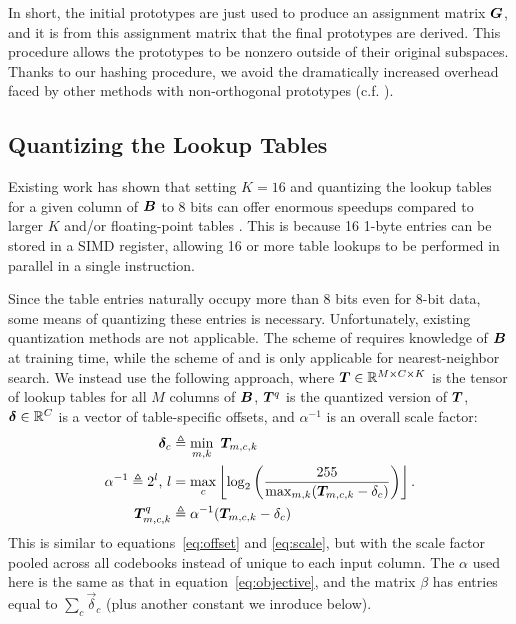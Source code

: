 In short, the initial prototypes are just used to produce an assignment matrix $\bm{G}$, and it is from this assignment matrix that the final prototypes are derived. This procedure allows the prototypes to be nonzero outside of their original subspaces. Thanks to our hashing procedure, we avoid the dramatically increased overhead faced by other methods with non-orthogonal prototypes (c.f. \cite{otq,aq,cq,grvq,lsq,stackedQuantizers}).

\subsection{Quantizing the Lookup Tables}

Existing work has shown that setting $K = 16$ and quantizing the lookup tables for a given column of $\bm{B}$ to 8 bits can offer enormous speedups compared to larger $K$ and/or floating-point tables \cite{bolt, quickAdc, quickerADC}. This is because 16 1-byte entries can be stored in a SIMD register, allowing 16 or more table lookups to be performed in parallel in a single instruction.

Since the table entries naturally occupy more than 8 bits even for 8-bit data, some means of quantizing these entries is necessary. Unfortunately, existing quantization methods are not applicable. The scheme of \citet{bolt} requires knowledge of $\bm{B}$ at training time, while the scheme of \citet{quickAdc} and \citet{quickerADC} is only applicable for nearest-neighbor search. We instead use the following approach, where $\bm{T} \in \mathbb{R}^{M \times C \times K}$ is the tensor of lookup tables for all $M$ columns of $\bm{B}$, $\bm{T}^{q}$ is the quantized version of $\bm{T}$, $\bm{\delta} \in \mathbb{R}^C$ is a vector of table-specific offsets, and $\alpha^{-1}$ is an overall scale factor:
\begin{align}
    \bm{\delta}_c &\triangleq \min_{m,k} \text{ } \bm{T}_{m,c,k} \\
    \alpha^{-1} \triangleq 2^l \text{, } l &= \max_c \left \lfloor  \log_2 \left( \frac{255}{
            \max_{m,k} (\bm{T}_{m,c,k} - \delta_{c})
        } \right) \right \rfloor. \\
    \bm{T}^{q}_{m,c,k} &\triangleq \alpha^{-1}(\bm{T}_{m,c,k} - \delta_{c})
\end{align}
This is similar to equations~\ref{eq:offset} and \ref{eq:scale}, but with the scale factor pooled across all codebooks instead of unique to each input column. The $\alpha$ used here is the same as that in equation~\ref{eq:objective}, and the matrix $\beta$ has entries equal to $\sum_c \vec{\delta}_c$ (plus another constant we inroduce below).

